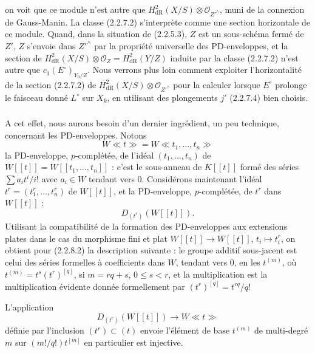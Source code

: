 \documentclass[12pt,a4paper]{article}
\theoremstyle{plain}
\theoremstyle{definition}
\theoremstyle{remark}
\begin{document}
on voit que ce module n'est autre que $H^2_\mathrm{dR}(X/S) \otimes \mathcal{O}_{Z'^\wedge}$, muni de la connexion de Gauss-Manin. La classe (2.2.7.2) s'interpr\`ete comme une section horizontale de ce module. Quand, dans la situation de (2.2.5.3), $Z$ est un sous-sch\'ema ferm\'e de $Z'$, $Z$ s'envoie dans $Z'^\wedge$ par la propri\'et\'e universelle des PD-enveloppes, et la section de $H^2_\mathrm{dR}(X/S) \otimes \mathcal{O}_Z = H^2_\mathrm{dR}(Y/Z)$ induite par la classe (2.2.7.2) n'est autre que $c_1(E^\circ)_{Y_0/Z}$. Nous verrons plus loin comment exploiter l'horizontalit\'e de la section (2.2.7.2) de $H^2_\mathrm{dR}(X/S) \otimes \mathcal{O}_{Z'^\wedge}$ pour la calculer lorsque $E^\circ$ prolonge le faisceau donn\'e $L^\circ$ sur $X_k$, en utilisant des plongements $j'$ (2.2.7.4) bien choisis.

\subsubsection{}
A cet effet, nous aurons besoin d'un dernier ingr\'edient, un peu technique, concernant les PD-enveloppes. Notons
\begin{equation}\tag{2.2.8.1}
W\ll t \gg = W\ll t_1, \ldots, t_n \gg 
\end{equation}
la PD-enveloppe, $p$-compl\'et\'ee, de l'id\'eal $(t_1, \ldots, t_n)$ de $W[[t]] = W[[t_1, \ldots, t_n]]$ : c'est le sous-anneau de $K[[t]]$ form\'e des s\'eries $\sum a_i t^i/i!$ avec $a_i \in W$ tendant vers $0$. Consid\'erons maintenant l'id\'eal $t^r = (t_1^r, \ldots, t_n^r)$ de $W[[t]]$, et la PD-enveloppe, $p$-compl\'et\'ee, de $t^r$ dans $W[[t]]$ :
\begin{equation}\tag{2.2.8.2}
D_{(t^r)}(W[[t]]). 
\end{equation}
Utilisant la compatibilit\'e de la formation des PD-enveloppes aux extensions plates \cite[I 2.7.4]{Berthelot} dans le cas du morphisme fini et plat $W[[t]] \to W[[t]]$, $t_i \mapsto t_i^r$, on obtient pour (2.2.8.2) la description suivante : le groupe additif sous-jacent est celui des s\'eries formelles \`a coefficients dans $W$, tendant vers $0$, en les $t^{(m)}$, o\`u $t^{(m)} = t^s(t^r)^{[q]}$, si $m = rq+s$, $0 \leqslant s < r$, et la multiplication est la multiplication \'evidente donn\'ee formellement par $(t^r)^{[q]} = t^{rq}/q!$

L'application
\begin{equation}\tag{2.2.8.3}
D_{(t^r)}(W[[t]]) \longrightarrow W\ll t \gg 
\end{equation}
d\'efinie par l'inclusion $(t^r) \subset (t)$ envoie l'\'el\'ement de base $t^{(m)}$ de multi-degr\'e $m$ sur $(m!/q!)t^{[m]}$ en particulier est injective.
\end{document}
